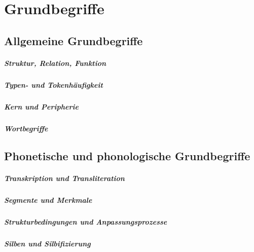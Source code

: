 \chapter{Grundbegriffe}

\section{Allgemeine Grundbegriffe}

\paragraph*{Struktur, Relation, Funktion}

\paragraph*{Typen- und Tokenhäufigkeit}

\paragraph*{Kern und Peripherie}

\paragraph*{Wortbegriffe}


\section{Phonetische und phonologische Grundbegriffe}

\paragraph*{Transkription und Transliteration}

\paragraph*{Segmente und Merkmale}

\paragraph*{Strukturbedingungen und Anpassungsprozesse}

\paragraph*{Silben und Silbifizierung}


